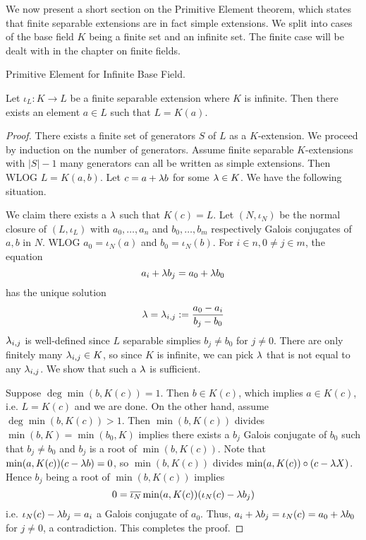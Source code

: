 \documentclass[../book.tex]{subfiles}
\begin{document}
We now present a short section on the Primitive Element theorem,
which states that finite separable extensions are in fact simple extensions.
We split into cases of the base field $K$ being a finite set and an infinite set. 
The finite case will be dealt with in the chapter on finite fields. 

\begin{thm} Primitive Element for Infinite Base Field.
    
    Let $\iota_L : K \to L$ be a finite separable extension where $K$ is infinite. 
    Then there exists an element $a \in L$ such that $L = K(a)$. 
\end{thm}
\begin{proof}
    
    There exists a finite set of generators $S$ of $L$ as a $K$-extension.
    We proceed by induction on the number of generators. 
    Assume finite separable $K$-extensions with $|S|-1$ many generators 
    can all be written as simple extensions. 
    Then WLOG $L = K(a, b)$. 
    Let $c = a + \lambda b$ for some $\lambda \in K$. 
    We have the following situation. 
    \begin{figure}[H]
        \centering
    \end{figure}
    We claim there exists a $\lambda$ such that $K(c) = L$. 
    Let $(N,\iota_N)$ be the normal closure of $(L,\iota_L)$
    with $a_0,\dots,a_n$ and $b_0,\dots,b_m$ 
    respectively Galois conjugates of $a, b$ in $N$.
    WLOG $a_0 = \iota_N(a)$ and $b_0 = \iota_N(b)$.
    For $i \in n, 0 \neq j \in m$, the equation \[
        a_i + \lambda b_j = a_0 + \lambda b_0
    \]
    has the unique solution \[
        \lambda = \lambda_{i,j} := \frac{a_0 - a_i}{b_j - b_0}
    \]
    $\lambda_{i,j}$ is well-defined since $L$ separable 
    simplies $b_j \neq b_0$ for $j\neq0$.
    There are only finitely many $\lambda_{i,j} \in K$, so since $K$ is infinite, 
    we can pick $\lambda$ that is not equal to any $\lambda_{i,j}$. 
    We show that such a $\lambda$ is sufficient.
    
    Suppose $\deg\min(b,K(c)) = 1$. 
    Then $b \in K(c)$, which implies $a \in K(c)$, i.e. $L = K(c)$ and we are done. 
    On the other hand, assume $\deg\min(b,K(c)) > 1$. 
    Then $\min(b,K(c))$ divides $\min(b,K) = \min(b_0,K)$ implies
    there exists a $b_j$ Galois conjugate of $b_0$ such that 
    $b_j \neq b_0$ and $b_j$ is a root of $\min(b,K(c))$. 
    Note that $\min(a,K(c)) (c - \lambda b) = 0$,
    so $\min(b,K(c))$ divides $\min(a,K(c)) \circ (c - \lambda X)$.
    Hence $b_j$ being a root of $\min(b,K(c))$ implies
    \[ 0 = \overline{\iota_N} \min(a,K(c)) (\iota_N(c) - \lambda b_j) \]
    i.e. $\iota_N(c) - \lambda b_j = a_i$ a Galois conjugate of $a_0$.
    Thus, $a_i + \lambda b_j = \iota_N(c) = a_0 + \lambda b_0$ for $j \neq 0$, 
    a contradiction. 
    This completes the proof. 
    
\end{proof}
\end{document}
